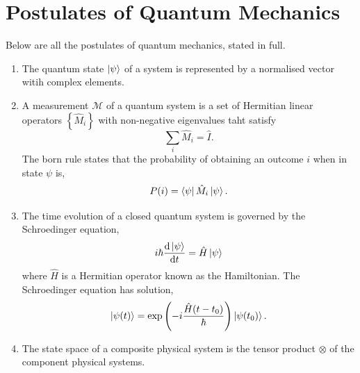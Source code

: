\documentclass{book}
\begin{document}
\chapter{Postulates of Quantum Mechanics}
Below are all the postulates of quantum mechanics, stated in full.
\begin{enumerate}
	\item The quantum state $\ket{\psi}$ of a system is represented by a normalised vector witih complex elements.
	\item A measurement $\mathcal{M}$ of a quantum system is a set of Hermitian linear operators $\left\{\hat{M}_i\right\}$ with non-negative eigenvalues taht satisfy
	\begin{equation}
		\sum_i \hat{M}_i = \hat{I}.
	\end{equation}
	The born rule states that the probability of obtaining an outcome $i$ when in state $\psi$ is,
	\begin{equation}
		P(i) = \bra{\psi}\hat{M}_i\ket{\psi}.
	\end{equation}
	\item The time evolution of a closed quantum system is governed by the Schroedinger equation,
	\begin{equation}
		i\hbar \dv{\ket{\psi}}{t} = \hat{H}\ket{\psi}
	\end{equation}
	where $\hat{H}$ is a Hermitian operator known as the Hamiltonian. The Schroedinger equation has solution,
	\begin{equation}
		\ket{\psi(t)} = \exp\left(-i\frac{\hat{H}(t-t_0)}{\hbar}\right)\ket{\psi(t_0)}.
	\end{equation}
	\item The state space of a composite physical system is the tensor product $\otimes$ of the component physical systems.
\end{enumerate}
\end{document}
